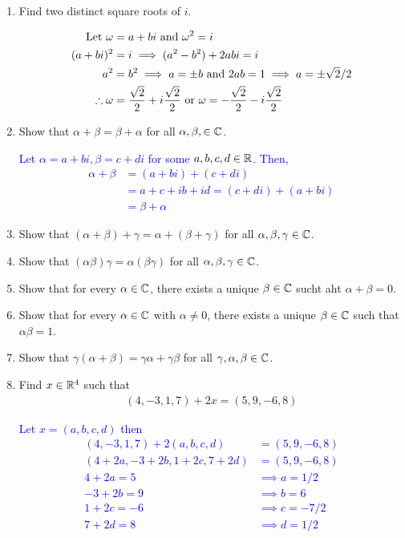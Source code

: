 \documentclass[10pt,a4paper]{report}
\newcommand{\BLUE}[1]{\textcolor{blue}{#1}}
\begin{document}
\begin{enumerate}
\item Find two distinct square roots of $i$.

\BLUE{\begin{align*}
	\text{Let } \omega &= a + bi \text{ and } \omega^2 = i\\
	(a+bi)^2 &= i \implies (a^2-b^2)+2abi = i \\
	a^2 &= b^2 \implies a = \pm b \text{ and } 2ab = 1 \implies a = \pm \sqrt{2}/2 \\
	\therefore \omega &= \frac{\sqrt{2}}{2} + i\frac{\sqrt{2}}{2} \text{ or } \omega = -\frac{\sqrt{2}}{2}-i\frac{\sqrt{2}}{2}
\end{align*}
}

\item Show that $\alpha + \beta=\beta+\alpha$ for all $\alpha, \beta, \in \mathbb{C}$.

\BLUE{Let $\alpha = a+bi, \beta = c+di$ for some $a,b,c,d \in \mathbb{R}$.  Then,
	\begin{align*}
		\alpha + \beta &= (a+bi)+(c+di) \\
		&= a+c+ib+id = (c+di)+(a+bi)\\
		&= \beta+\alpha
	\end{align*}
}

\item Show that $(\alpha+\beta)+\gamma=\alpha+(\beta+\gamma)$ for all $\alpha, \beta, \gamma \in\mathbb{C}$.

\item Show that $(\alpha\beta)\gamma =  \alpha(\beta\gamma)$ for all $\alpha, \beta, \gamma \in \mathbb{C}$.

\item Show that for every $\alpha \in \mathbb{C}$, there exists a unique $\beta \in \mathbb{C}$ sucht aht $\alpha +\beta = 0$.

\item Show that for every $\alpha \in \mathbb{C}$ with $\alpha \ne 0$, there exists a unique $\beta \in \mathbb{C}$ such that $\alpha\beta = 1$.

\item Show that $\gamma(\alpha+\beta)=\gamma\alpha+\gamma\beta$ for all $\gamma,\alpha,\beta \in \mathbb{C}$.

\item Find $x \in \mathbb{R}^4$ such that 
\begin{align*}
	(4,-3,1,7)+2x=(5,9,-6,8)
\end{align*}

\BLUE{Let $x=(a,b,c,d)$ then
\begin{align*}
	(4,-3,1,7)+2(a,b,c,d)&=(5,9,-6,8) \\
	(4+2a,-3+2b, 1+2c, 7+2d) &= (5,9,-6,8) \\
	4+2a = 5 &\implies a = 1/2 \\
	-3+2b = 9 &\implies b = 6 \\
	1+2c = -6 &\implies c = -7/2 \\
	7+2d = 8 &\implies d = 1/2
\end{align*}
}


\end{enumerate}
\end{document}
